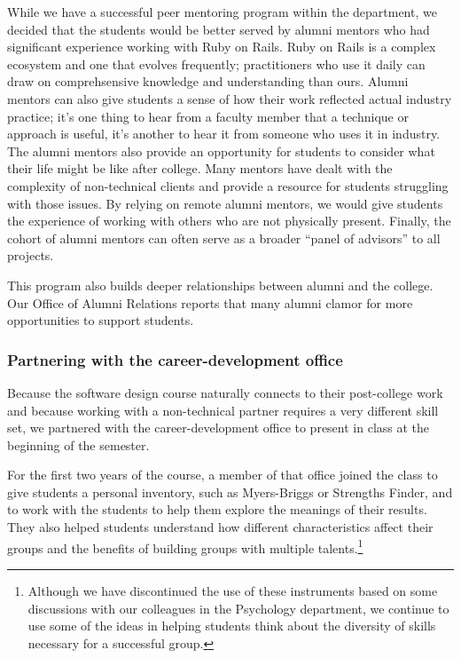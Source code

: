 While we have a successful peer mentoring program within the department,
we decided that the students would be better served by alumni mentors
who had significant experience working with Ruby on Rails.
Ruby on Rails is a complex ecosystem and one that evolves
frequently; practitioners who use it daily can draw on
comprehsensive knowledge and understanding than ours.  Alumni mentors
can also give students a sense of how their work
reflected actual industry practice; it's one thing to hear from a
faculty member that a technique or approach is useful, it's another
to hear it from someone who uses it in industry.  The
alumni mentors also provide an opportunity for students to consider
what their life might be like after college.  Many mentors have
dealt with the complexity of non-technical clients and provide a
resource for students struggling with those issues.  By relying on
remote alumni mentors, we would give students the experience of
working with others who are not physically present.  Finally, the
cohort of alumni mentors can often serve as a broader ``panel of
advisors'' to all projects.

This program also builds deeper relationships between
alumni and the college.  Our Office of Alumni Relations reports
that many alumni clamor for more opportunities to support
students.

\subsubsection{Partnering with the career-development office}

Because the software design course naturally connects to their
post-college work and because working with a non-technical partner
requires a very different skill set, we partnered with the
career-development office to present in class at the beginning of
the semester.

For the first two years of the course, a member of that office
joined the class to give students a personal 
inventory, such as Myers-Briggs or Strengths Finder, and to work
with the students to help them explore the meanings of their results.
They also helped students understand how different
characteristics affect their groups and the benefits of building
groups with multiple talents.\footnote{Although we have discontinued the use of
these instruments based on some discussions with our colleagues in
the Psychology department, we continue to use some of the ideas in
helping students think about the diversity of skills necessary for
a successful group.}

